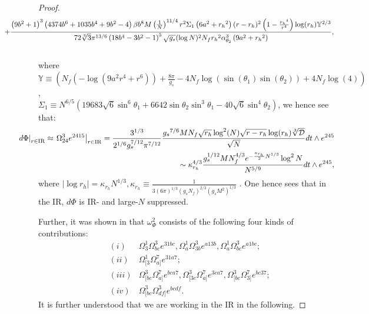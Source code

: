 \documentclass[a4paper,11pt,fleqn]{article}
\theoremstyle{plain}
\theoremstyle{definition}
\begin{document}
\begin{proof}
{\begin{eqnarray}
& & \hskip -0.8in + \frac{\left(9 b^2+1\right)^3 \left(4374 b^6+1035 b^4+9
   b^2-4\right) \beta  b^8 M \left(\frac{1}{N}\right)^{11/4} r^2 \Sigma _1
   \left(6 a^2+{r_h}^2\right) (r-{r_h})^2
   \left(1-\frac{{r_h}^4}{r^4}\right) \log ({r_h})\mathbb{Y}^{2/3}}{72 \sqrt[3]{3} \pi
   ^{13/6} \left(18 b^4-3 b^2-1\right)^5 \sqrt{{g_s}}  (\log N) ^2
    N_f  {r_h}^2 \alpha _{\theta_2}^3 \left(9
   a^2+{r_h}^2\right)},\nonumber\\
   & & 
\end{eqnarray}
}
where $\mathbb{Y}\equiv  \left( N_f 
   \left(-\log \left(9 a^2 r^4+r^6\right)\right)+\frac{8 \pi }{{g_s}}-4
    N_f  \log \left(\sin \left(\theta_1\right) \sin \left(\theta
   _2\right)\right)+4  N_f  \log (4)\right)$,\\ $\Sigma_1 \equiv N^{6/5}\left(19683\sqrt{6}\sin^6\theta_1 + 6642\sin\theta_2\sin^3\theta_1 - 40\sqrt{6}\sin^4\theta_2\right)$, we hence see that:
\begin{eqnarray}
\label{dPhi-LO-IR}
& & \hskip -0.5in \left.d\Phi\right|_{r\in{\rm IR}} \approx \left.\Omega^3_{24}e^{2415}\right|_{r\in{\rm IR}}=\frac{3^{1/3}}{2^{1/6}g_s^{7/12}\pi^{7/12}}\frac{{g_s}^{7/6} M  N_f  \sqrt{{r_h}} \log ^2(N)
   \sqrt{r-{r_h}} \log ({r_h}) \sqrt[3]{\cal D}}{\sqrt{N}}dt\wedge e^{245}\nonumber\\
& & \hskip -0.5in \sim \kappa_{r_h}^{4/3}\frac{g_s^{1/12}M N_f^{4/3}e^{-\frac{\kappa_{r_h}}{2}N^{1/3}}\log^2N}{N^{5/9}}dt\wedge e^{245},
\end{eqnarray}
where $|\log r_h|=\kappa_{r_h}N^{1/3}, \kappa_{r_h}\equiv\frac{1}{3(6\pi)^{1/3}(g_sN_f)^{2/3}(g_sM^2)^{1/3}}$ \cite{IITR-McGill-bulk-viscosity}. One hence sees that in the IR, $d\Phi$ is IR- and large-$N$ suppressed. 

Further, it was shown in \cite{ACMS} that $\omega_\Phi^2$ consists of the following four kinds of contributions:
\begin{eqnarray}
\label{omegaPhisq-kinds-contributions}
& (i) & \Omega^1_3\Omega^3_{bc}e^{31bc}, \Omega^1_a\Omega^3_{3b}e^{a13b}, 
\Omega^1_a\Omega^3_{bc} e^{a1bc};\nonumber\\
& (ii) & \Omega^1_{[3}\Omega^7_{a]} e^{31a7};\nonumber\\
& (iii) & \Omega^3_{[bc}\Omega^7_{a]} e^{bca7}, \Omega^3_{[3c}\Omega^7_{a]}e^{3ca7},
\Omega^3_{[bc}\Omega^7_{3]}e^{bc37};\nonumber\\
& (iv) & \Omega^3_{[bc}\Omega^3_{df]}e^{bcdf}. 
\end{eqnarray}
It is further understood that we are working in the IR in the following.




\end{proof}
\end{document}
